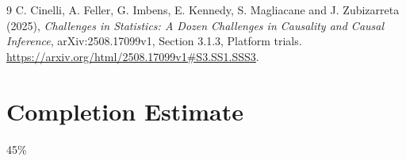 \documentclass[11pt]{article}
\theoremstyle{remark}
\begin{document}
\begin{thebibliography}{9}
 C. Cinelli, A. Feller, G. Imbens, E. Kennedy,
S. Magliacane and J. Zubizarreta (2025), \emph{Challenges in Statistics:
A Dozen Challenges in Causality and Causal Inference}, arXiv:2508.17099v1,
Section 3.1.3, Platform trials.
\url{https://arxiv.org/html/2508.17099v1#S3.SS1.SSS3}.
\end{thebibliography}

\section{Completion Estimate}
45\%
\end{document}
